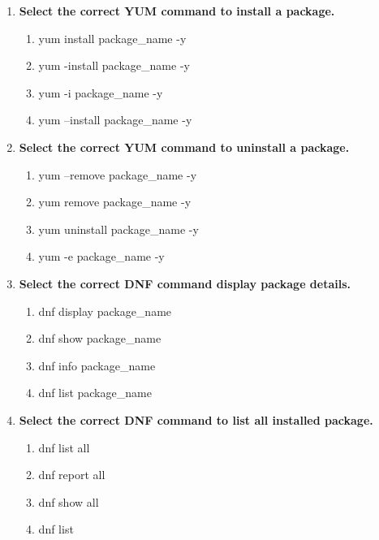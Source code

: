 \begin{flushleft}
\begin{enumerate}
		\item \textbf{Select the correct YUM command to install a package.}
		\begin{enumerate}[label=(\alph*)]
			\item yum install package\_name -y %
			\item yum -install package\_name -y 
			\item yum -i package\_name -y 
			\item yum --install package\_name -y 
		\end{enumerate}
		\bigskip
		\bigskip	

		\item \textbf{Select the correct YUM command to uninstall a package.}
		\begin{enumerate}[label=(\alph*)]
			\item yum --remove package\_name -y 
			\item yum remove package\_name -y %
			\item yum uninstall package\_name -y
			\item yum -e package\_name -y
		\end{enumerate}
		\bigskip
		\bigskip	
		
		
		\item \textbf{Select the correct DNF command display package details.}
		\begin{enumerate}[label=(\alph*)]
			\item dnf display package\_name
			\item dnf show package\_name
			\item dnf info package\_name   %
			\item dnf list package\_name
		\end{enumerate}
		\bigskip
		\bigskip	

		\item \textbf{Select the correct DNF command to list all installed package.}
		\begin{enumerate}[label=(\alph*)]
			\item dnf list all   %
			\item dnf report all
			\item dnf show all
			\item dnf list
		\end{enumerate}
		\bigskip
		\bigskip	

		
	\end{enumerate}
	
	
\end{flushleft}

\newpage

\afterpage{\blankpage}